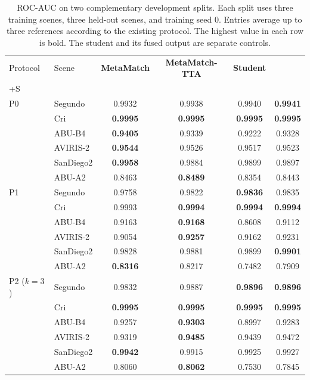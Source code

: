 \documentclass[a4paper,11pt]{article}
\renewcommand{\arraystretch}{1.18}
\begin{document}
\begin{table}[H]\centering\footnotesize\setlength{\tabcolsep}{4pt}\renewcommand{\arraystretch}{1.12}
\caption{ROC-AUC on two complementary development splits. Each split uses three training scenes, three held-out scenes, and training seed 0. Entries average up to three references according to the existing protocol. The highest value in each row is bold. The student and its fused output are separate controls.}\label{full:tab:dev}
\begin{lrbox}{\fulltablebox}\begin{tabular}{llcccc}\toprule
Protocol & Scene & \textbf{MetaMatch} & \textbf{MetaMatch-TTA} & \textbf{Student} & \shortstack{\textbf{MetaMatch-TTA}\\+S} \\ \midrule
P0 & Segundo & 0.9932 & 0.9938 & 0.9940 & \textbf{0.9941} \\
 & Cri & \textbf{0.9995} & \textbf{0.9995} & \textbf{0.9995} & \textbf{0.9995} \\
 & ABU-B4 & \textbf{0.9405} & 0.9339 & 0.9222 & 0.9328 \\
 & AVIRIS-2 & \textbf{0.9544} & 0.9526 & 0.9517 & 0.9523 \\
 & SanDiego2 & \textbf{0.9958} & 0.9884 & 0.9899 & 0.9897 \\
 & ABU-A2 & 0.8463 & \textbf{0.8489} & 0.8354 & 0.8443 \\
P1 & Segundo & 0.9758 & 0.9822 & \textbf{0.9836} & 0.9835 \\
 & Cri & 0.9993 & \textbf{0.9994} & \textbf{0.9994} & \textbf{0.9994} \\
 & ABU-B4 & 0.9163 & \textbf{0.9168} & 0.8608 & 0.9112 \\
 & AVIRIS-2 & 0.9054 & \textbf{0.9257} & 0.9162 & 0.9231 \\
 & SanDiego2 & 0.9828 & 0.9881 & 0.9899 & \textbf{0.9901} \\
 & ABU-A2 & \textbf{0.8316} & 0.8217 & 0.7482 & 0.7909 \\
P2 ($k=3$) & Segundo & 0.9832 & 0.9887 & \textbf{0.9896} & \textbf{0.9896} \\
 & Cri & \textbf{0.9995} & \textbf{0.9995} & \textbf{0.9995} & \textbf{0.9995} \\
 & ABU-B4 & 0.9257 & \textbf{0.9303} & 0.8997 & 0.9283 \\
 & AVIRIS-2 & 0.9319 & \textbf{0.9485} & 0.9439 & 0.9472 \\
 & SanDiego2 & \textbf{0.9942} & 0.9915 & 0.9925 & 0.9927 \\
 & ABU-A2 & 0.8060 & \textbf{0.8062} & 0.7530 & 0.7845 \\

\end{tabular}
\end{lrbox}
\end{table}
\end{document}

